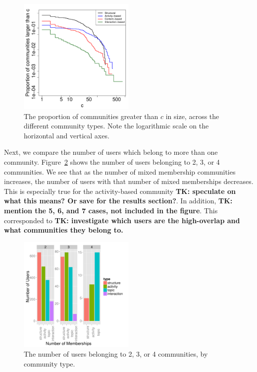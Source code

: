 \begin{figure}[ht]
  \centering
\includegraphics[width=0.50\textwidth]{Figures/comm_sizes_ecdf_loglog.pdf}
\caption{The proportion of communities greater than $c$ in size, across the different community types. Note the logarithmic scale on the horizontal and vertical axes.}
\label{Fig-community_size_distribution}
\end{figure}

Next, we compare the number of users which belong to more than one community. Figure~\ref{Fig-overlap_plot} shows the number of users belonging to 2, 3, or 4 communities. We see that as the number of mixed membership communities increases, the number of users with that number of mixed memberships decreases. This is especially true for the activity-based community \textbf{TK: speculate on what this means? Or save for the results section?}.  In addition, \textbf{TK: mention the 5, 6, and 7 cases, not included in the figure}. This corresponded to \textbf{TK: investigate which users are the high-overlap and what communities they belong to.}


\begin{figure}[ht]
  \centering
\includegraphics[width=0.50\textwidth]{Figures/overlap_by_type.pdf}
\caption{The number of users belonging to 2, 3, or 4 communities, by community type.}
\label{Fig-overlap_plot}
\end{figure}

